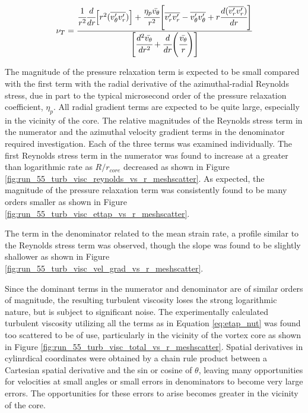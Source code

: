 \begin{equation}
\nu_T =
    \cfrac{\cfrac{1}{r^2}\cfrac{d}{dr}\Big[r^2 (\overline{v_{\theta}^\prime 
    v_{r}^\prime})\Big] +
	\cfrac{\eta_p \bar{v_\theta}}{r^2}\Bigg[\overline{v_{r}^\prime 
	v_{r}^\prime} - 
	\overline{v_{\theta}^\prime v_{\theta}^\prime} + 
	r \cfrac{d(\overline{v_{r}^\prime 
	v_{r}^\prime})}{dr}\Bigg]} {\Bigg[\cfrac{d^2 \bar{v_{\theta}}}{dr^2} + 
	\cfrac{d}{dr}
	\Bigg(\cfrac{\bar{v_{\theta}}}{r}\Bigg)\Bigg]}
\label{eq:etap_nut}
\end{equation}

\noindent
The magnitude of the pressure relaxation term is expected to be small compared 
with the first term with the radial derivative of the azimuthal-radial Reynolds 
stress, due in part to the typical microsecond order of the pressure relaxation 
coefficient, $\eta_p$. All radial gradient terms are expected to be quite 
large, especially in the vicinity of the core. The relative magnitudes of the 
Reynolds stress term in the numerator and the azimuthal velocity gradient terms 
in the denominator required investigation. Each of the three 
terms was examined individually. The first Reynolds stress term in the 
numerator was found to increase at a greater than logarithmic rate as 
$R/r_{core}$ decreased as shown in Figure 
\ref{fig:run_55_turb_visc_reynolds_vs_r_meshscatter}. As expected, the 
magnitude of the pressure relaxation term was consistently found to be many 
orders smaller as shown in Figure 
\ref{fig:run_55_turb_visc_ettap_vs_r_meshscatter}.




The term in the denominator related to the mean strain rate, a profile similar 
to the Reynolds stress term was observed, 
though the slope was found to be slightly shallower as shown in Figure 
\ref{fig:run_55_turb_visc_vel_grad_vs_r_meshscatter}.




Since the dominant terms in the numerator and denominator are of similar orders 
of magnitude, the resulting turbulent viscosity loses the strong logarithmic 
nature, but is subject to significant noise. The experimentally 
calculated turbulent viscosity utilizing all the terms as in Equation 
\ref{eq:etap_nut} was found too scattered to be of use, particularly in the 
vicinity of the vortex core as shown in Figure 
\ref{fig:run_55_turb_visc_total_vs_r_meshscatter}. Spatial derivatives in 
cylinrdical coordinates were obtained by a chain rule product between a 
Cartesian spatial derivative and the sin or cosine of $\theta$, leaving many 
opportunities for velocities at small angles or small errors in denominators to 
become very large errors. The opportunities for these errors to arise becomes 
greater in the vicinity of the core.


